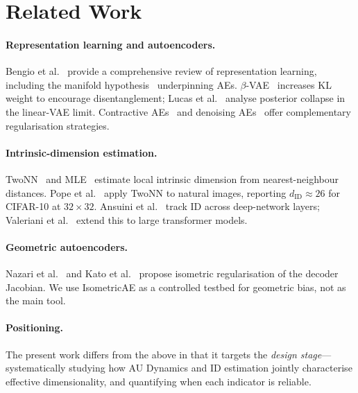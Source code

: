 \documentclass[11pt,a4paper]{article}
\begin{document}
\section{Related Work}\label{sec:related}

\paragraph{Representation learning and autoencoders.}
Bengio et al.~\cite{bengio2013representation} provide a comprehensive review of
representation learning, including the manifold hypothesis~\cite{fefferman2016manifold}
underpinning AEs.  $\beta$-VAE~\cite{higgins2017betavae} increases KL weight to
encourage disentanglement; Lucas et al.~\cite{lucas2019elbo} analyse posterior
collapse in the linear-VAE limit.  Contractive AEs~\cite{rifai2011cae} and
denoising AEs~\cite{alain2014dae} offer complementary regularisation strategies.

\paragraph{Intrinsic-dimension estimation.}
TwoNN~\cite{facco2017twonn} and MLE~\cite{levina2005mle} estimate local
intrinsic dimension from nearest-neighbour distances.  Pope et
al.~\cite{pope2021intrinsic} apply TwoNN to natural images, reporting
$d_{\mathrm{ID}}\approx26$ for CIFAR-10 at $32\!\times\!32$.  Ansuini et
al.~\cite{ansuini2019intrinsic} track ID across deep-network layers; Valeriani
et al.~\cite{valeriani2023geometry} extend this to large transformer models.

\paragraph{Geometric autoencoders.}
Nazari et al.~\cite{nazari2023geometric} and Kato et
al.~\cite{kato2020rdae} propose isometric regularisation of the decoder Jacobian.
We use IsometricAE as a controlled testbed for geometric bias, not as the main tool.

\paragraph{Positioning.}
The present work differs from the above in that it targets the \emph{design
stage}—systematically studying how AU Dynamics and ID estimation jointly
characterise effective dimensionality, and quantifying when each indicator is
reliable.

\end{document}
